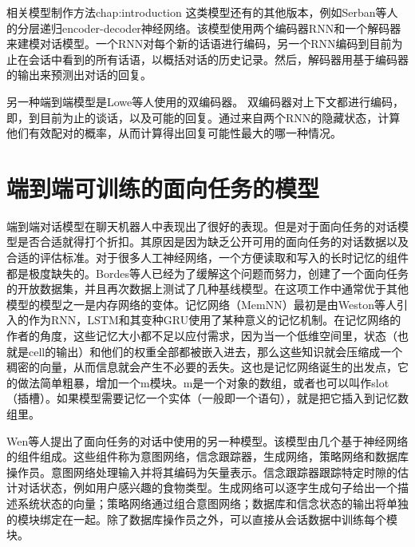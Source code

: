 \begin{cuzchapter}{相关模型制作方法}{chap:introduction}
这类模型还有的其他版本，例如Serban等人的分层递归encoder-decoder神经网络\cite{Serban2016Building}。该模型使用两个编码器RNN和一个解码器来建模对话模型。一个RNN对每个新的话语进行编码，另一个RNN编码到目前为止在会话中看到的所有话语，以概括对话的历史记录。然后，解码器用基于编码器的输出来预测出对话的回复。

另一种端到端模型是Lowe等人使用的双编码器\cite{DDUbuntu}。 双编码器对上下文都进行编码，即，到目前为止的谈话，以及可能的回复。通过来自两个RNN的隐藏状态，计算他们有效配对的概率，从而计算得出回复可能性最大的哪一种情况。
\section{端到端可训练的面向任务的模型}\label{sec:background}
端到端对话模型在聊天机器人中表现出了很好的表现。但是对于面向任务的对话模型是否合适就得打个折扣。其原因是因为缺乏公开可用的面向任务的对话数据以及合适的评估标准。对于很多人工神经网络，一个方便读取和写入的长时记忆的组件都是极度缺失的。Bordes等人已经为了缓解这个问题而努力，创建了一个面向任务的开放数据集，并且再次数据上测试了几种基线模型。在这项工作中通常优于其他模型的模型之一是内存网络的变体。记忆网络（MemNN）\cite{DBLP:journals/corr/MemoryNetworks}最初是由Weston等人引入的作为RNN，LSTM和其变种GRU使用了某种意义的记忆机制。在记忆网络的作者的角度，这些记忆大小都不足以应付需求，因为当一个低维空间里，状态（也就是cell的输出）和他们的权重全部都被嵌入进去，那么这些知识就会压缩成一个稠密的向量，从而信息就会产生不必要的丢失。这也是记忆网络诞生的出发点，它的做法简单粗暴，增加一个m模块。m是一个对象的数组，或者也可以叫作slot（插槽）。如果模型需要记忆一个实体（一般即一个语句），就是把它插入到记忆数组里。

Wen等人提出了面向任务的对话中使用的另一种模型\cite{DBLP:journals/corr/WenGMRSUVY16}。该模型由几个基于神经网络的组件组成。这些组件称为意图网络，信念跟踪器，生成网络，策略网络和数据库操作员\cite{Wen2017A}。意图网络处理输入并将其编码为矢量表示。信念跟踪器跟踪特定时隙的估计对话状态，例如用户感兴趣的食物类型。生成网络可以逐字生成句子给出一个描述系统状态的向量；策略网络通过组合意图网络；数据库和信念状态的输出将单独的模块绑定在一起。除了数据库操作员之外，可以直接从会话数据中训练每个模块。

\end{cuzchapter}
